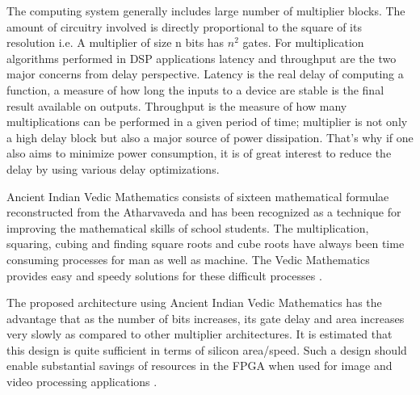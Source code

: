 The computing system generally includes large number of multiplier blocks. The amount of circuitry involved is directly proportional to the square of its resolution i.e. A multiplier of size n bits has $n^{2}$ gates. For multiplication algorithms performed in DSP applications latency and throughput are the two major concerns from delay perspective. Latency is the real delay of computing a function, a measure of how long the inputs to a device are stable is the final result available on outputs. Throughput is the measure of how many multiplications can be performed in a given period of time; multiplier is not only a high delay block but also a major source of power dissipation. That's why if one also aims to minimize power consumption, it is of great interest to reduce the delay by using various delay optimizations.


Ancient Indian Vedic Mathematics consists of sixteen mathematical formulae reconstructed from the Atharvaveda and has been recognized as a
technique for improving the mathematical skills of school students. The multiplication, squaring, cubing and finding square roots and cube roots have always been time consuming processes for man as well as machine. The Vedic Mathematics provides easy and speedy solutions for these difficult processes \cite{r1}.

The proposed architecture using Ancient Indian Vedic Mathematics has the advantage that as the number of bits increases, its gate delay and area
increases very slowly as compared to other multiplier architectures. It is estimated that this design is quite sufficient in terms of silicon area/speed. Such a design should enable substantial savings of resources in the FPGA when used for image and video processing applications \cite{r6}.


